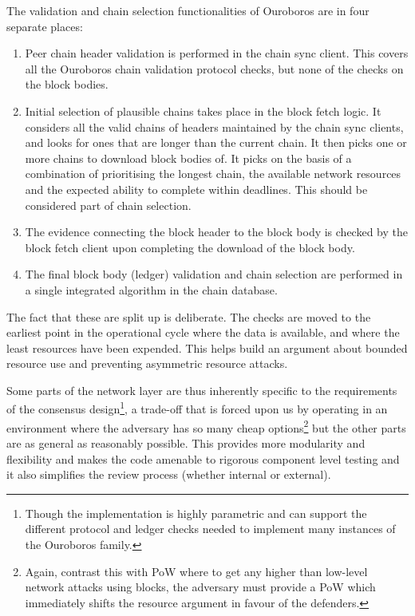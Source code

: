 \documentclass[11pt,a4paper]{article}
\begin{document}
The validation and chain selection functionalities of Ouroboros are in
four separate places:

\begin{enumerate}
\item
  Peer chain header validation is performed in the chain sync client.
  This covers all the Ouroboros chain validation protocol checks, but
  none of the checks on the block bodies.
\item
  Initial selection of plausible chains takes place in the block fetch
  logic. It considers all the valid chains of headers maintained by the
  chain sync clients, and looks for ones that are longer than the
  current chain. It then picks one or more chains to download block
  bodies of. It picks on the basis of a combination of prioritising the
  longest chain, the available network resources and the expected
  ability to complete within deadlines. This should be considered part
  of chain selection.
\item
  The evidence connecting the block header to the block body is checked
  by the block fetch client upon completing the download of the block
  body.
\item
  The final block body (ledger) validation and chain selection are
  performed in a single integrated algorithm in the chain database.
\end{enumerate}

The fact that these are split up is deliberate. The checks are moved to
the earliest point in the operational cycle where the data is available,
and where the least resources have been expended. This helps build an
argument about bounded resource use and preventing asymmetric resource
attacks.

Some parts of the network layer are thus inherently specific to the
requirements of the consensus design\footnote{Though the implementation
  is highly parametric and can support the different protocol and ledger
  checks needed to implement many instances of the Ouroboros family.}, a
trade-off that is forced upon us by operating in an environment where
the adversary has so many cheap options\footnote{Again, contrast this
  with PoW where to get any higher than low-level network attacks using
  blocks, the adversary must provide a PoW which immediately shifts the
  resource argument in favour of the defenders.} but the other parts are
as general as reasonably possible. This provides more modularity and
flexibility and makes the code amenable to rigorous component level
testing and it also simplifies the review process (whether internal or
external).
\end{document}
